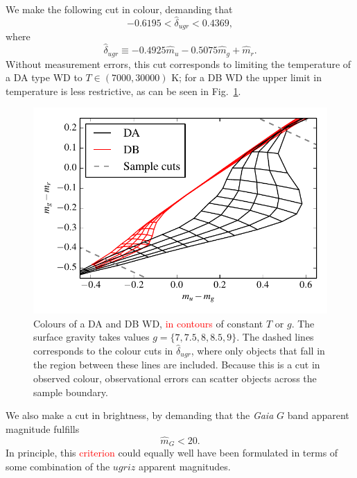 \documentclass[fleqn,usenatbib]{mnras}
\newcommand{\changes}[1]{\textcolor{red}{#1}}
\newcommand{\Teff}{T}
\newcommand{\logg}{g}
\begin{document}
We make the following cut in colour, demanding that
\begin{equation}
	-0.6195 < \hat{\delta}_{ugr} < 0.4369,
\end{equation}
where
\begin{equation}
	\hat{\delta}_{ugr} \equiv -0.4925\hat{m}_u-0.5075\hat{m}_g+\hat{m}_r.
\end{equation}
Without measurement errors, this cut corresponds to limiting the temperature of a DA type WD to $\Teff \in (7000,30000)$ K; for a DB WD the upper limit in temperature is less restrictive, as can be seen in Fig.~\ref{fig:colors_cut}.

\begin{figure}
	\includegraphics[width=\columnwidth]{colors_cut.pdf}
    \caption{Colours of a DA and DB WD, \changes{in contours} of constant $\Teff$ or $\logg$. The surface gravity takes values $\logg = \{7,7.5,8,8.5,9\}$. The dashed lines corresponds to the colour cuts in $\hat{\delta}_{ugr}$, where only objects that fall in the region between these lines are included. Because this is a cut in observed colour, observational errors can scatter objects across the sample boundary.}
    \label{fig:colors_cut}
\end{figure}

We also make a cut in brightness, by demanding that the \emph{Gaia} $G$ band apparent magnitude fulfills
\begin{equation}
	\hat{m}_G < 20.
\end{equation}
In principle, this \changes{criterion} could equally well have been formulated in terms of some combination of the $ugriz$ apparent magnitudes.
\end{document}

